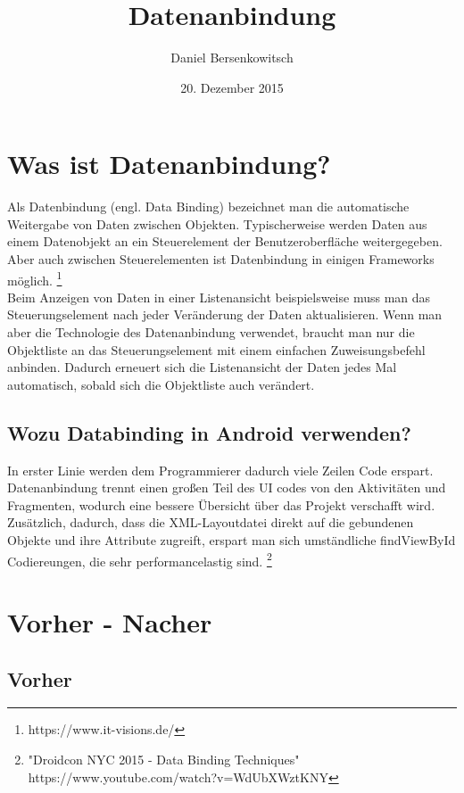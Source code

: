\documentclass[a4paper,12pt]{article}
\title{Datenanbindung}
\author{Daniel Bersenkowitsch}
\date{20. Dezember 2015}
\begin{document}
\maketitle
\newpage
\tableofcontents
\newpage

\section{Was ist Datenanbindung?}
Als Datenbindung (engl. Data Binding) bezeichnet man die automatische Weitergabe von Daten zwischen Objekten. Typischerweise werden Daten aus einem Datenobjekt an ein Steuerelement der Benutzeroberfläche weitergegeben. Aber auch zwischen Steuerelementen ist Datenbindung in einigen Frameworks möglich. \footnote{https://www.it-visions.de/}\\
Beim Anzeigen von Daten in einer Listenansicht beispielsweise muss man das Steuerungselement nach jeder Veränderung der Daten aktualisieren. Wenn man aber die Technologie des Datenanbindung verwendet, braucht man nur die Objektliste an das Steuerungselement mit einem einfachen Zuweisungsbefehl anbinden. Dadurch erneuert sich die Listenansicht der Daten jedes Mal automatisch, sobald sich die Objektliste auch verändert.

\subsection{Wozu Databinding in Android verwenden?}
In erster Linie werden dem Programmierer dadurch viele Zeilen Code erspart. Datenanbindung trennt einen großen Teil des UI codes von den Aktivitäten und Fragmenten, wodurch eine bessere Übersicht über das Projekt verschafft wird. Zusätzlich, dadurch, dass die XML-Layoutdatei direkt auf die gebundenen Objekte und ihre Attribute zugreift, erspart man sich umständliche findViewById Codiereungen, die sehr performancelastig sind. \footnote{"Droidcon NYC 2015 - Data Binding Techniques" \\ https://www.youtube.com/watch?v=WdUbXWztKNY}


\section{Vorher - Nacher}
\subsection{Vorher}
\end{document}
